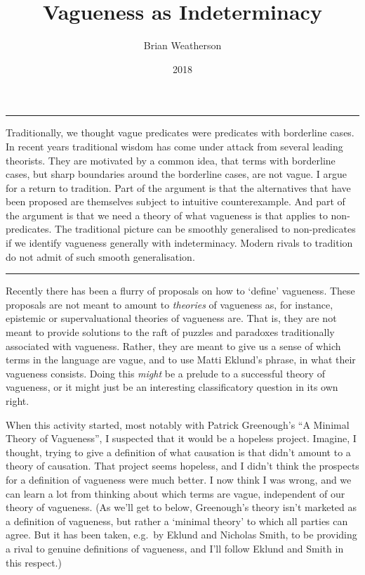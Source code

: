 \documentclass[
  10pt,
  letterpaper,
  DIV=11,
  numbers=noendperiod,
  twoside]{scrartcl}
\title{Vagueness as Indeterminacy}
\author{Brian Weatherson}
\date{2018}
\renewenvironment{abstract}
 {\vspace{-1.25cm}
 \quotation\small\noindent\rule{\linewidth}{.5pt}\par\smallskip
 \noindent }
 {\par\noindent\rule{\linewidth}{.5pt}\endquotation}
\begin{document}
\maketitle
\begin{abstract}
Traditionally, we thought vague predicates were predicates with
borderline cases. In recent years traditional wisdom has come under
attack from several leading theorists. They are motivated by a common
idea, that terms with borderline cases, but sharp boundaries around the
borderline cases, are not vague. I argue for a return to tradition. Part
of the argument is that the alternatives that have been proposed are
themselves subject to intuitive counterexample. And part of the argument
is that we need a theory of what vagueness is that applies to
non-predicates. The traditional picture can be smoothly generalised to
non-predicates if we identify vagueness generally with indeterminacy.
Modern rivals to tradition do not admit of such smooth generalisation.
\end{abstract}

Recently there has been a flurry of proposals on how to `define'
vagueness. These proposals are not meant to amount to \emph{theories} of
vagueness as, for instance, epistemic or supervaluational theories of
vagueness are. That is, they are not meant to provide solutions to the
raft of puzzles and paradoxes traditionally associated with vagueness.
Rather, they are meant to give us a sense of which terms in the language
are vague, and to use Matti Eklund's phrase, in what their vagueness
consists. Doing this \emph{might} be a prelude to a successful theory of
vagueness, or it might just be an interesting classificatory question in
its own right.

When this activity started, most notably with Patrick Greenough's ``A
Minimal Theory of Vagueness'', I suspected that it would be a hopeless
project. Imagine, I thought, trying to give a definition of what
causation is that didn't amount to a theory of causation. That project
seems hopeless, and I didn't think the prospects for a definition of
vagueness were much better. I now think I was wrong, and we can learn a
lot from thinking about which terms are vague, independent of our theory
of vagueness. (As we'll get to below, Greenough's theory isn't marketed
as a definition of vagueness, but rather a `minimal theory' to which all
parties can agree. But it has been taken, e.g.~by Eklund and Nicholas
Smith, to be providing a rival to genuine definitions of vagueness, and
I'll follow Eklund and Smith in this respect.)
\end{document}
